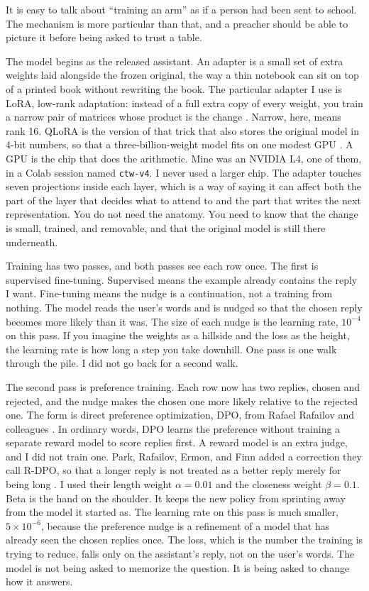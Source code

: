 \documentclass[11pt]{article}
\begin{document}
It is easy to talk about ``training an arm'' as if a person had been sent to school. The mechanism is more particular than that, and a preacher should be able to picture it before being asked to trust a table.

The model begins as the released assistant. An adapter is a small set of extra weights laid alongside the frozen original, the way a thin notebook can sit on top of a printed book without rewriting the book. The particular adapter I use is LoRA, low-rank adaptation: instead of a full extra copy of every weight, you train a narrow pair of matrices whose product is the change \citep{hu2021}. Narrow, here, means rank 16. QLoRA is the version of that trick that also stores the original model in 4-bit numbers, so that a three-billion-weight model fits on one modest GPU \citep{dettmers2023}. A GPU is the chip that does the arithmetic. Mine was an NVIDIA L4, one of them, in a Colab session named \texttt{ctw-v4}. I never used a larger chip. The adapter touches seven projections inside each layer, which is a way of saying it can affect both the part of the layer that decides what to attend to and the part that writes the next representation. You do not need the anatomy. You need to know that the change is small, trained, and removable, and that the original model is still there underneath.

Training has two passes, and both passes see each row once. The first is supervised fine-tuning. Supervised means the example already contains the reply I want. Fine-tuning means the nudge is a continuation, not a training from nothing. The model reads the user's words and is nudged so that the chosen reply becomes more likely than it was. The size of each nudge is the learning rate, $10^{-4}$ on this pass. If you imagine the weights as a hillside and the loss as the height, the learning rate is how long a step you take downhill. One pass is one walk through the pile. I did not go back for a second walk.

The second pass is preference training. Each row now has two replies, chosen and rejected, and the nudge makes the chosen one more likely relative to the rejected one. The form is direct preference optimization, DPO, from Rafael Rafailov and colleagues \citep{rafailov2023}. In ordinary words, DPO learns the preference without training a separate reward model to score replies first. A reward model is an extra judge, and I did not train one. Park, Rafailov, Ermon, and Finn added a correction they call R-DPO, so that a longer reply is not treated as a better reply merely for being long \citep{park2024}. I used their length weight $\alpha = 0.01$ and the closeness weight $\beta = 0.1$. Beta is the hand on the shoulder. It keeps the new policy from sprinting away from the model it started as. The learning rate on this pass is much smaller, $5 \times 10^{-6}$, because the preference nudge is a refinement of a model that has already seen the chosen replies once. The loss, which is the number the training is trying to reduce, falls only on the assistant's reply, not on the user's words. The model is not being asked to memorize the question. It is being asked to change how it answers.
\end{document}
